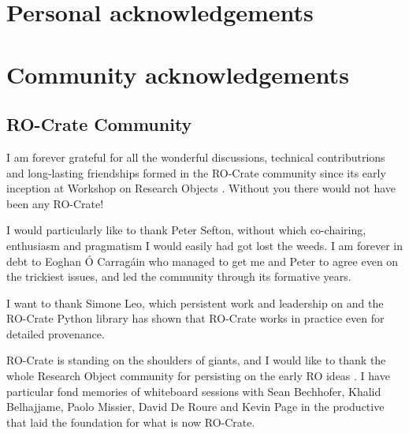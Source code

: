 \label{ch11:acknowledgements}

\hypertarget{personal-acknowledgements}{%
\section{Personal acknowledgements}\label{personal-acknowledgements}}


\hypertarget{community-acknowledgements}{%
\section{Community acknowledgements}\label{community-acknowledgements}}

\subsection{RO-Crate Community}\label{communitylist}
\label{ro-crate-community}

I am forever grateful for all the wonderful discussions, technical contributrions and long-lasting friendships formed in the RO-Crate community since its early inception \cite{OCarragain 2019} at Workshop on Research Objects . Without you there would not have been any RO-Crate!

I would particularly like to thank Peter Sefton, without which co-chairing, enthusiasm and pragmatism I would easily had got lost the weeds.  I am forever in debt to Eoghan Ó Carragáin who managed to get me and Peter to agree even on the trickiest issues, and led the community through its formative years.

I want to thank Simone Leo, which persistent work and leadership on  and the RO-Crate Python library \cite{ro-crate-py} has shown that RO-Crate works in practice even for detailed provenance.

RO-Crate is standing on the shoulders of giants, and I would like to thank the whole Research Object community \cite{goble-ro2018} for persisting on the early RO ideas \cite{ch5-93, Bechhofer 2013}. I have particular fond memories of whiteboard sessions with Sean Bechhofer, Khalid Belhajjame, Paolo Missier, David De Roure and Kevin Page in the productive  that laid the foundation for what is now RO-Crate.


